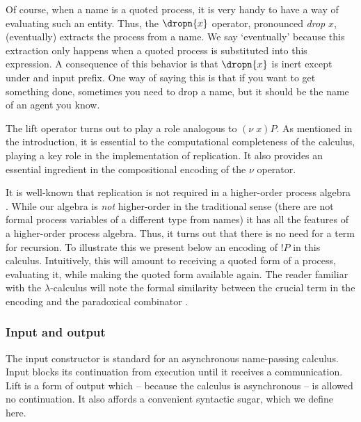Of course, when a name is a quoted process, it is very handy to have a
way of evaluating such an entity. Thus, the $\dropn{x}$ operator,
pronounced \textit{drop} $x$, (eventually) extracts the process from a
name. We say `eventually' because this extraction only happens when a
quoted process is substituted into this expression. A consequence of
this behavior is that $\dropn{x}$ is inert except under and input
prefix. One way of saying this is that if you want to get something
done, sometimes you need to drop a name, but it should be the name of
an agent you know.

\begin{remark} %
The lift operator turns out to play a role analogous to $(\nu \;
x)P$. As mentioned in the introduction, it is essential to the
computational completeness of the calculus, playing a key role in the
implementation of replication. It also provides an essential
ingredient in the compositional encoding of the $\nu$ operator.
\end{remark}

\begin{remark} %
It is well-known that replication is not required in a higher-order
process algebra \cite{SangiorgiWalker}. While our algebra is
\textit{not} higher-order in the traditional sense (there are not
formal process variables of a different type from names) it has all
the features of a higher-order process algebra. Thus, it turns out
that there is no need for a term for recursion. To illustrate this we
present below an encoding of $!P$ in this calculus. Intuitively, this
will amount to receiving a quoted form of a process, evaluating it,
while making the quoted form available again. The reader familiar with
the $\lambda$-calculus will note the formal similarity between the
crucial term in the encoding and the paradoxical combinator
\cite{Barendregt84}.
\end{remark}

\subsubsection{Input and output}

The input constructor is standard for an asynchronous name-passing
calculus. Input blocks its continuation from execution until it
receives a communication. Lift is a form of output which -- because
the calculus is asynchronous -- is allowed no continuation. It also
affords a convenient syntactic sugar, which we define here.

